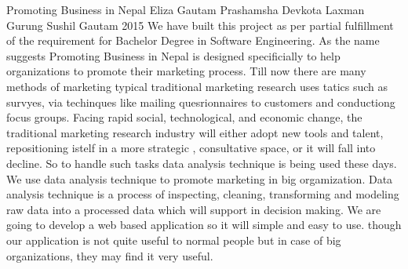  \begin{conf-abstract}[]
{Promoting Business in Nepal}
{
 Eliza Gautam
 Prashamsha Devkota
 Laxman Gurung
 Sushil Gautam
}
{2015}
We have built this project as per partial fulfillment of the requirement for Bachelor Degree in Software Engineering. As the name suggests Promoting Business in Nepal is designed specificially to help organizations to promote their marketing process. Till now there are many methods of marketing typical traditional marketing research uses tatics such as survyes, via techinques like mailing quesrionnaires to customers and conductiong focus groups. Facing rapid social, technological, and economic change, the traditional marketing research industry will either adopt new tools and talent, repositioning istelf in a more strategic , consultative space, or it will fall into decline. So to handle such tasks data analysis technique is being used these days. We use data analysis technique to promote marketing in big orgamization. Data analysis technique is a process of inspecting, cleaning, transforming and modeling raw data into a processed data which will support in decision making. We are going to develop a web based application so it will simple and easy to use. though our application is not quite useful to normal people but in case of big organizations, they may find it very useful. 
  \end{conf-abstract}
